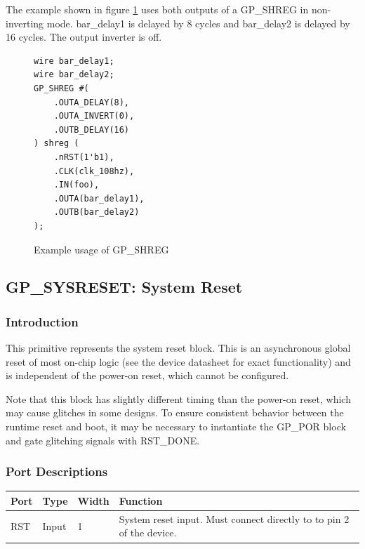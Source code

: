 \documentclass[11pt]{article}
\begin{document}
The example shown in figure \ref{gp-shreg-example} uses both outputs of a GP\_SHREG in non-inverting mode. 
bar\_delay1 is delayed by 8 cycles and bar\_delay2 is delayed by 16 cycles. The output inverter is off.

\begin{figure}[h]
\begin{lstlisting}
wire bar_delay1;
wire bar_delay2;
GP_SHREG #(
	.OUTA_DELAY(8),
	.OUTA_INVERT(0),
	.OUTB_DELAY(16)
) shreg (
	.nRST(1'b1),
	.CLK(clk_108hz),
	.IN(foo),
	.OUTA(bar_delay1),
	.OUTB(bar_delay2)
);
\end{lstlisting}
\caption{Example usage of GP\_SHREG}
\label{gp-shreg-example}
\end{figure}


\pagebreak
\clearpage
\subsection{GP\_SYSRESET: System Reset}

\subsubsection{Introduction}
This primitive represents the system reset block. This is an asynchronous global reset of most on-chip logic (see the
device datasheet for exact functionality) and is independent of the power-on reset, which cannot be configured.

Note that this block has slightly different timing than the power-on reset, which may cause glitches in some designs. 
To ensure consistent behavior between the runtime reset and boot, it may be necessary to instantiate the GP\_POR 
block and gate glitching signals with RST\_DONE.

\subsubsection{Port Descriptions}

\begin{tabularx}{5in}{|l|l|l|X|}
\hline
{\bfseries Port} & {\bfseries Type} & {\bfseries Width} & {\bfseries Function} \\
\hline
RST & Input & 1 & System reset input. Must connect directly to to pin 2 of the device.\\
\hline
\end{tabularx}
\end{document}
